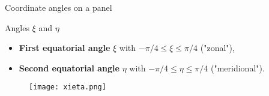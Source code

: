 \documentclass[11pt]{beamer}
\begin{document}
\begin{frame}{Coordinate angles on a panel}
\begin{block}{Angles $\xi$ and $\eta$}
\begin{itemize}
\item \textbf{First equatorial angle} $\xi$ with $-\pi/4 \leq \xi \leq \pi/4$ ("zonal"),
\item \textbf{Second equatorial angle} $\eta$ with $-\pi/4 \leq \eta \leq \pi/4$ ("meridional"). 
\end{itemize}
\end{block}

\begin{figure}
\texttt{[image: xieta.png]}
\end{figure}

%
%
\end{frame}
\end{document}
